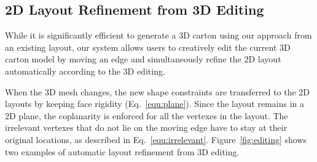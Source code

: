 

\subsection{2D Layout Refinement from 3D Editing}

While it is significantly efficient to generate a 3D carton using our approach from an existing layout, our system allows users to creatively edit the current 3D carton model by moving an edge and simultaneously refine the 2D layout automatically according to the 3D editing.

When the 3D mesh changes, the new shape constraints are transferred to the 2D layouts by keeping face rigidity (Eq.~\ref{equ:plane}).
Since the layout remains in a 2D plane, the coplanarity is enforced for all the vertexes in the layout. 
%
% 
The irrelevant vertexes that do not lie on the moving edge have to stay at their original locations, as described in Eq.~\ref{equ:irrelevant}.
Figure~\ref{fig:editing} shows two examples of automatic layout refinement from 3D editing.                                                                     

